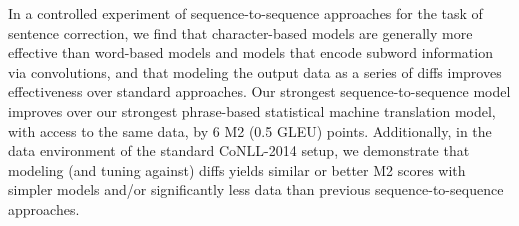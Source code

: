 In a controlled experiment of sequence-to-sequence approaches for the task of sentence correction, we find that character-based models are generally more effective than word-based models and models that encode subword information via convolutions, and that modeling the output data as a series of diffs improves effectiveness over standard approaches. Our strongest sequence-to-sequence model improves over our strongest phrase-based statistical machine translation model, with access to the same data, by 6 M2 (0.5 GLEU) points. Additionally, in the data environment of the standard CoNLL-2014 setup, we demonstrate that modeling (and tuning against) diffs yields similar or better M2 scores with simpler models and/or significantly less data than previous sequence-to-sequence approaches.
